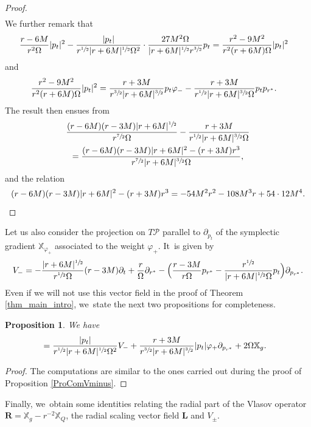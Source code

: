 \documentclass[JEP,XML,SOM,Unicode,published]{cedram}
\theoremstyle{plain}
\newtheorem{proposition}{Proposition}[section]
\theoremstyle{definition}
\newcommand\T{{\mathbb{X}}}
\begin{document}
\begin{proof}
\begin{align*}
\end{align*}
We further remark that
\begin{align*}
\frac{r-6M}{r^2 \Omega} |p_t|^2 -\frac{|p_t|}{r^{\sfrac{1}{2}}|r+6M|^{\sfrac{1}{2}}\Omega^2}\cdot \frac{27M^2 \Omega}{|r+6M|^{\sfrac{1}{2}}r^{\sfrac{3}{2}}}p_t &= \frac{r^2-9M^2}{r^2(r+6M) \Omega} |p_t|^2
\end{align*}
and
\begin{align*}
\frac{r^2-9M^2}{r^2(r+6M) \Omega} |p_t|^2 &=\frac{r+3M}{r^{\sfrac{3}{2}}|r+6M|^{\sfrac{3}{2}} } p_t \varphi_-- \frac{r+3M}{r^{\sfrac{1}{2}}|r+6M|^{\sfrac{3}{2}} \Omega } p_t p_{r^*}.
\end{align*}
The result then ensues from
\begin{multline*}
\frac{(r-6M)(r-3M)|r+6M|^{\sfrac{1}{2}}}{r^{\sfrac{7}{2}} \Omega }- \frac{r+3M}{r^{\sfrac{1}{2}}|r+6M|^{\sfrac{3}{2}} \Omega } \\
=\frac{(r-6M)(r-3M)|r+6M|^2-(r+3M)r^3}{r^{\sfrac{7}{2}} |r+6M|^{\sfrac{3}{2}} \Omega},
\end{multline*}
and the relation
\[
(r-6M)(r-3M)|r+6M|^2-(r+3M)r^3=-54M^2r^2-108M^3r+54 \cdot 12 M^4.\qedhere
\]
\end{proof}

Let us also consider the projection on $T \mathcal{P}$ parallel to $\partial_{p_t}$ of the symplectic gradient $\T_{\varphi_+}$ associated to the weight $\varphi_+$. It~is given by
\[
V_- =- \frac{|r+6M|^{\sfrac{1}{2}}}{r^{\sfrac{1}{2}}\Omega}(r-3M) \partial_t+\frac{r}{\Omega} \partial_{r^*}-\Bigl(\frac{r-3M}{r\Omega}p_{r^*}-\frac{r^{\sfrac{1}{2}}}{|r+6M|^{\sfrac{1}{2}} \Omega}p_t \Bigr) \partial_{p_{r^*}}.
\]
Even if we will not use this vector field in the proof of Theorem \ref{thm_main_intro}, we~state the next two propositions for completeness.

\begin{proposition}\label{ProVplus}
We have
\begin{align*}
[\T_g,V_-] &= \frac{|p_t|}{r^{\sfrac{1}{2}}|r+6M|^{\sfrac{1}{2}}\Omega^2} V_-+ \frac{r+3M}{r^{\sfrac{3}{2}}|r+6M|^{\sfrac{3}{2}}}|p_t|\varphi_+ \partial_{p_{r^*}} + 2\Omega \T_g.
\end{align*}
\end{proposition}
\begin{proof}
The computations are similar to the ones carried out during the proof of Proposition \ref{ProComVminus}.
\end{proof}
Finally, we~obtain some identities relating the radial part of the Vlasov operator $\pmb{R}=\T_g-r^{-2}\T_Q$, the radial scaling vector field $\pmb{L}$ and $V_{\pm}$.
\end{document}
